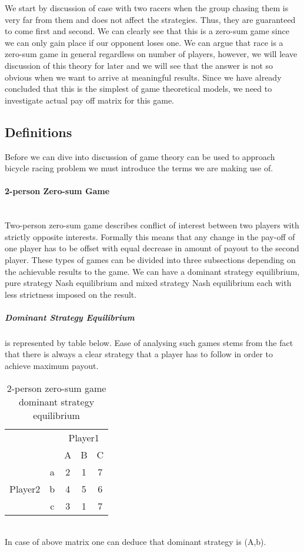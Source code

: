 \documentclass[10pt, a4paper]{report}
\begin{document}
We start by discussion of case with two racers when the group chasing them is very far from them and does not affect the strategies. Thus, they are guaranteed to come first and second. We can clearly see that this is a zero-sum game since we can only gain place if our opponent loses one. We can argue that race is a zero-sum game in general regardless on number of players, however, we will leave discussion of this theory for later and we will see that the answer is not so obvious when we want to arrive at meaningful results. Since we have already concluded that this is the simplest of game theoretical models, we need to investigate actual pay off matrix for this game.


\subsection{Definitions}\label{subsec:defs}

Before we can dive into discussion of game theory can be used to approach bicycle racing problem we must introduce the terms we are making use of.

\paragraph{2-person Zero-sum Game} ~\\
Two-person zero-sum game describes conflict of interest between two players with strictly opposite interests. Formally this means that any change in the pay-off of one player has to be offset with equal decrease in amount of payout to the second player. These types of games can be divided into three subsections depending on the achievable results to the game. We can have a dominant strategy equilibrium, pure strategy Nash equilibrium and mixed strategy Nash equilibrium each with less strictness imposed on the result.
\subparagraph{Dominant Strategy Equilibrium}
is represented by table below. Ease of analysing such games stems from the fact that there is always a clear strategy that a player has to follow in order to achieve maximum payout.
\begin{table}[ht!]
	\hspace{-4em}
	\centering
	\begin{tabular}{ccccc|}
		& & \multicolumn{3}{c}{Player1}                                \\ \cline{3-5}
		& & A & B & \multicolumn{1}{c}{C}                              \\ \cline{3-5}
		\multirow{3}{*}{Player2} & \multicolumn{1}{|c|}{a} & 2 & 1 & 7 \\
		& \multicolumn{1}{|c|}{b} & 4 & 5 & 6                          \\
		& \multicolumn{1}{|c|}{c} & 3 & 1 & 7                          \\ \cline{3-5}
	\end{tabular}
	\caption{2-person zero-sum game\\ dominant strategy equilibrium}
\end{table}
\\
In case of above matrix one can deduce that dominant strategy is (A,b).
\end{document}
